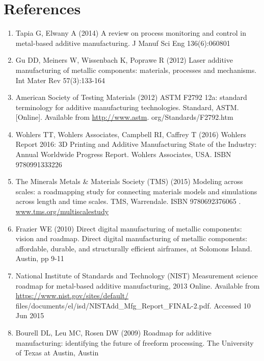 \documentclass[10pt]{article}
\begin{document}
\section*{References}
\begin{enumerate}
  \item Tapia G, Elwany A (2014) A review on process monitoring and control in metal-based additive manufacturing. J Manuf Sci Eng 136(6):060801

  \item Gu DD, Meiners W, Wissenbach K, Poprawe R (2012) Laser additive manufacturing of metallic components: materials, processes and mechanisms. Int Mater Rev 57(3):133-164

  \item American Society of Testing Materials (2012) ASTM F2792 12a: standard terminology for additive manufacturing technologies. Standard, ASTM. [Online]. Available from \href{http://www.astm}{http://www.astm}. org/Standards/F2792.htm

  \item Wohlers TT, Wohlers Associates, Campbell RI, Caffrey T (2016) Wohlers Report 2016: 3D Printing and Additive Manufacturing State of the Industry: Annual Worldwide Progress Report. Wohlers Associates, USA. ISBN 9780991333226

  \item The Minerals Metals \& Materials Society (TMS) (2015) Modeling across scales: a roadmapping study for connecting materials models and simulations across length and time scales. TMS, Warrendale. ISBN 9780692376065 . \href{http://www.tms.org/multiscalestudy}{www.tms.org/multiscalestudy}

  \item Frazier WE (2010) Direct digital manufacturing of metallic components: vision and roadmap. Direct digital manufacturing of metallic components: affordable, durable, and structurally efficient airframes, at Solomons Island. Austin, pp 9-11

  \item National Institute of Standards and Technology (NIST) Measurement science roadmap for metal-based additive manufacturing, 2013 Online. Available from \href{https://www.nist.gov/sites/default/}{https://www.nist.gov/sites/default/} files/documents/el/isd/NISTAdd\_Mfg\_Report\_FINAL-2.pdf. Accessed 10 Jun 2015

  \item Bourell DL, Leu MC, Rosen DW (2009) Roadmap for additive manufacturing: identifying the future of freeform processing. The University of Texas at Austin, Austin


\end{enumerate}
\end{document}
